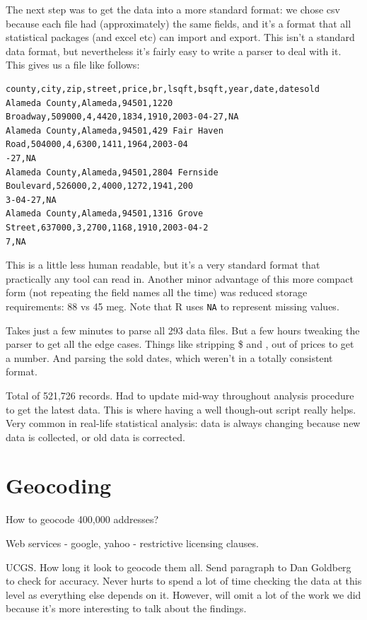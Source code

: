 \documentclass[oneside]{article}
\begin{document}
The next step was to get the data into a more standard format: we chose csv because each file had (approximately) the same fields, and it's a format that all statistical packages (and excel etc) can import and export.  This isn't a standard data format, but nevertheless it's fairly easy to write a parser to deal with it.  This gives us a file like follows:

\begin{verbatim}
county,city,zip,street,price,br,lsqft,bsqft,year,date,datesold
Alameda County,Alameda,94501,1220 Broadway,509000,4,4420,1834,1910,2003-04-27,NA
Alameda County,Alameda,94501,429 Fair Haven Road,504000,4,6300,1411,1964,2003-04
-27,NA
Alameda County,Alameda,94501,2804 Fernside Boulevard,526000,2,4000,1272,1941,200
3-04-27,NA
Alameda County,Alameda,94501,1316 Grove Street,637000,3,2700,1168,1910,2003-04-2
7,NA
\end{verbatim}

This is a little less human readable, but it's a very standard format that practically any tool can read in.  Another minor advantage of this more compact form (not repeating the field names all the time) was reduced storage requirements: 88 vs 45 meg.  Note that R uses {\tt NA} to represent missing values.

Takes just a few minutes to parse all 293 data files.  But a few hours tweaking the parser to get all the edge cases.  Things like stripping \$ and , out of prices to get a number.  And parsing the sold dates, which weren't in a totally consistent format.

Total of 521,726 records.  Had to update mid-way throughout analysis procedure to get the latest data.  This is where having a well though-out script really helps.  Very common in real-life statistical analysis: data is always changing because new data is collected, or old data is corrected.  

\section{Geocoding} 

How to geocode 400,000 addresses?  

Web services - google, yahoo - restrictive licensing clauses.

UCGS.  How long it look to geocode them all.  Send paragraph to Dan Goldberg to check for accuracy.  Never hurts to spend a lot of time checking the data at this level as everything else depends on it.  However, will omit a lot of the work we did because it's more interesting to talk about the findings.
\end{document}
